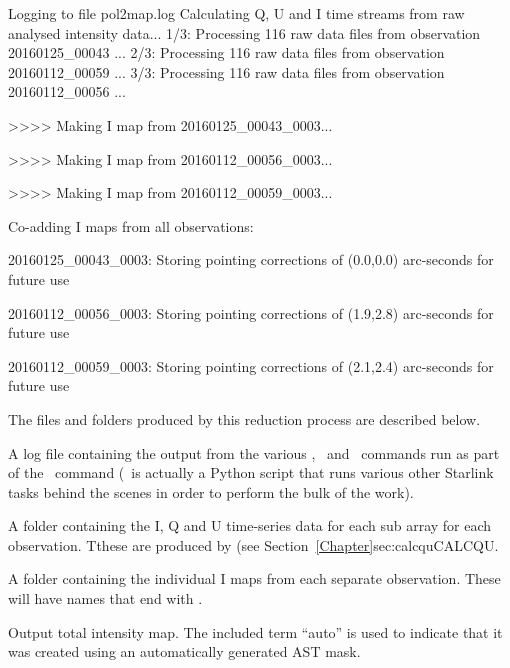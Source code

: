 \begin{terminalv}
Logging to file pol2map.log
Calculating Q, U and I time streams from raw analysed intensity data...
   1/3: Processing 116 raw data files from observation 20160125_00043 ...
   2/3: Processing 116 raw data files from observation 20160112_00059 ...
   3/3: Processing 116 raw data files from observation 20160112_00056 ...

>>>>   Making I map from 20160125_00043_0003...

>>>>   Making I map from 20160112_00056_0003...

>>>>   Making I map from 20160112_00059_0003...

Co-adding I maps from all observations:

20160125_00043_0003: Storing pointing corrections of (0.0,0.0) arc-seconds
for future use

20160112_00056_0003: Storing pointing corrections of (1.9,2.8) arc-seconds
for future use

20160112_00059_0003: Storing pointing corrections of (2.1,2.4) arc-seconds
for future use

\end{terminalv}

The files and folders produced by this reduction process are described below.

\begin{aligndesc}
\item[\file{pol2map.log}] A log file containing the output from the
  various \SMURF, \KAPPA\ and \POLPACK\ commands run as part of the \poltwomap\
  command (\poltwomap\ is actually a Python script that runs various other
  Starlink tasks behind the scenes in order to perform the bulk of the work).

\item[\file{qudata/}] A folder containing the I, Q and U time-series data
  for each sub array for each observation. Tthese are produced by
  \task{calcqu} (see Section~\cref{Chapter}{sec:calcqu}{CALCQU}.

\item[\file{maps/}] A folder containing the individual I maps from
  each separate observation. These will have names that end with
  \file{$\_$imap.sdf}.

\item[\file{iauto.sdf}] Output total intensity map. The included term ``auto'' is
used to indicate that it was created using an automatically generated
AST mask.

\end{aligndesc}

